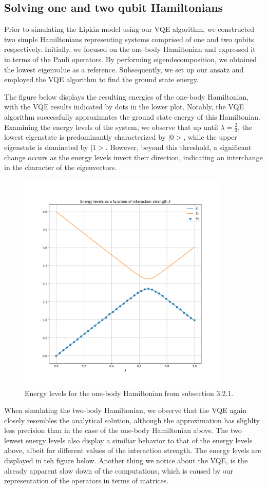\documentclass[onecolumn,10pt,cleanfoot]{asme2ej}
\begin{document}
\subsection{Solving one and two qubit Hamiltonians} 
Prior to simulating the Lipkin model using our VQE algorithm, we constructed two simple Hamiltonians representing systems comprised of one and two qubits respectively. Initially, we focused on the one-body Hamiltonian and expressed it in terms of the Pauli operators. By performing eigendecomposition, we obtained the lowest eigenvalue as a reference. Subsequently, we set up our ansatz and employed the VQE algorithm to find the ground state energy.

The figure below displays the resulting energies of the one-body Hamiltonian, with the VQE results indicated by dots in the lower plot. Notably, the VQE algorithm successfully approximates the ground state energy of this Hamiltonian. Examining the energy levels of the system, we observe that up until $\lambda=\frac{2}{3}$, the lowest eigenstate is predominantly characterized by $|0>$, while the upper eigenstate is dominated by $|1>$. However, beyond this threshold, a significant change occurs as the energy levels invert their direction, indicating an interchange in the character of the eigenvectors.

\begin{figure}[H]
  \centering
  \includegraphics[width=0.9\textwidth, height=0.65\textwidth]{figures/VQE_vs_Analytical_1qubit.png}
  \caption{Energy levels for the one-body Hamiltonian from subsection 3.2.1.}
  \label{fig:ex2}
\end{figure}

When simulating the two-body Hamiltonian, we observe that the VQE again closely resembles the analytical solution, although the approximation has slighlty less precision than in the case of the one-body Hamiltonian above. The two lewest energy levels also display a similiar behavior to that of the energy levels above, albeit for different values of the interaction strength. The energy levels are displayed in teh figure below. Another thing we notice about the VQE, is the already apparent slow down of the computations, which is caused by our representation of the operators in terms of matrices. 
\end{document}

